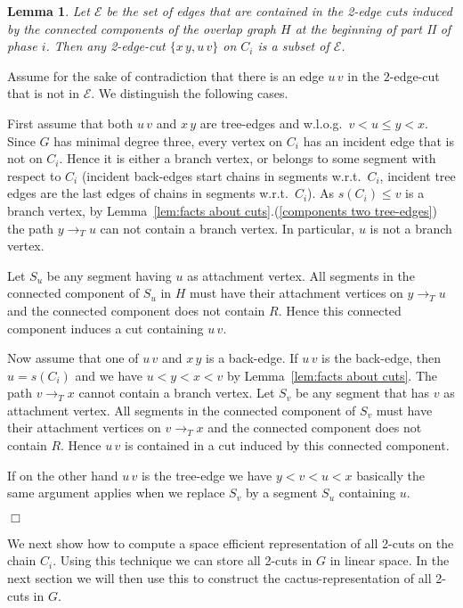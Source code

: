 \documentclass[paper=a4]{scrartcl}
\newtheorem{lemma}{Lemma}
\newcommand{\mqed}{\hfill$\Box$}
\newlength{\proofpostskipamount}\newlength{\proofpreskipamount}
\newenvironment{proof}{\par\vspace{\proofpreskipamount}\noindent{\textbf{Proof:}}\hspace{0.5em}}{\nopagebreak \strut\nopagebreak \hspace{\fill}\mqed\par\vspace{\proofpostskipamount}\noindent}
\newcommand{\edge}[2]{\ensuremath{#1\,#2}}
\begin{document}
\begin{lemma}\label{lem:h induces all cuts}
Let $\mathcal E$ be the set of edges that are contained in the 2-edge cuts induced by the connected components of the overlap graph $H$ at the beginning of part II of phase $i$. Then any 2-edge-cut $\{\edge xy, \edge uv\}$ on $C_i$ is a subset of $\mathcal E$.
\end{lemma}
\begin{proof}
Assume for the sake of contradiction that there is an edge $\edge uv$ in the $2$-edge-cut that is not in $\mathcal E$. We distinguish the following cases.

First assume that both $\edge uv$ and $\edge xy$ are tree-edges and w.l.o.g.\ $v<u\le y<x$. Since $G$ has minimal degree three, every vertex on $C_i$ has an incident edge that is not on $C_i$. Hence it is either a branch vertex, or belongs to some segment with respect to $C_i$ (incident back-edges start chains in segments w.r.t.\ $C_i$, incident tree edges are the last edges of chains in segments w.r.t.\ $C_i$). As $s(C_i) \le v$ is a branch vertex, by Lemma~\ref{lem:facts about cuts}.(\ref{components two tree-edges}) the path $y\rightarrow_T u$ can not contain a branch vertex. In particular, $u$ is not a branch vertex.

Let $S_u$ be any segment having $u$ as attachment vertex. All segments in the connected component of $S_u$ in $H$ must have their attachment vertices on $y\rightarrow _T u$ and the connected component does not contain $R$. Hence this connected component induces a cut containing $\edge uv$.

Now assume that one of $\edge uv$ and $\edge xy$ is a back-edge. If $\edge uv$ is the back-edge, then $u=s(C_i)$ and we have $u<y<x<v$ by Lemma~\ref{lem:facts about cuts}. The path $v\rightarrow_T x$ cannot contain a branch vertex. Let $S_v$ be any segment that has $v$ as attachment vertex. All segments in the connected component of $S_v$ must have their attachment vertices on $v\rightarrow_T x$ and the connected component does not contain $R$. Hence $\edge uv$ is contained in a cut induced by this connected component.

If on the other hand $\edge uv$ is the tree-edge we have $y<v<u<x$ basically the same argument applies when we replace $S_v$ by a segment $S_u$ containing $u$.
\end{proof}





We next show how to compute a space efficient representation of all 2-cuts on the chain $C_i$. Using this technique we can store all 2-cuts in $G$ in linear space. In the next section we will then use this to construct the cactus-representation of all 2-cuts in $G$.
\end{document}
